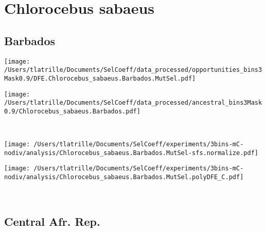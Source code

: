 \documentclass{article}
\begin{document}
    \section{Chlorocebus sabaeus}

    \subsection{Barbados}

    \begin{minipage}{0.49\linewidth}
        \texttt{[image: /Users/tlatrille/Documents/SelCoeff/data\_processed/opportunities\_bins3Mask0.9/DFE.Chlorocebus\_sabaeus.Barbados.MutSel.pdf]}
    \end{minipage}
    \begin{minipage}{0.49\linewidth}
        \texttt{[image: /Users/tlatrille/Documents/SelCoeff/data\_processed/ancestral\_bins3Mask0.9/Chlorocebus\_sabaeus.Barbados.pdf]}
    \end{minipage}
    \\
    \begin{minipage}{0.49\linewidth}
        \texttt{[image: /Users/tlatrille/Documents/SelCoeff/experiments/3bins-mC-nodiv/analysis/Chlorocebus\_sabaeus.Barbados.MutSel-sfs.normalize.pdf]}
    \end{minipage}
    \begin{minipage}{0.49\linewidth}
        \texttt{[image: /Users/tlatrille/Documents/SelCoeff/experiments/3bins-mC-nodiv/analysis/Chlorocebus\_sabaeus.Barbados.MutSel.polyDFE\_C.pdf]}
    \end{minipage}
    \\
    \subsection{Central Afr. Rep.}
\end{document}
